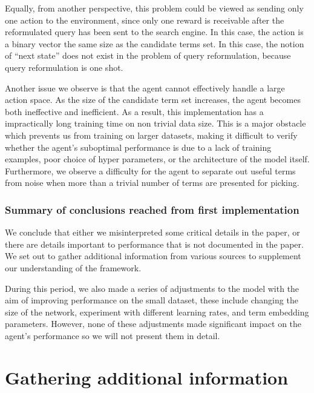 Equally, from another perspective, this problem could be viewed as sending only one action to the environment, since only one reward is receivable after the reformulated query has been sent to the search engine. In this case, the action is a binary vector the same size as the candidate terms set. In this case, the notion of “next state” does not exist in the problem of query reformulation, because query reformulation is one shot.

Another issue we observe is that the agent cannot effectively handle a large action space. As the size of the candidate term set increases, the agent becomes both ineffective and inefficient.  As a result, this implementation has a impractically long training time on non trivial data size. This is a major obstacle which prevents us from training on larger datasets, making it difficult to verify whether the agent’s suboptimal performance is due to a lack of training examples, poor choice of hyper parameters, or the architecture of the model itself. Furthermore, we observe a difficulty for the agent to separate out useful terms from noise when more than a trivial number of terms are presented for picking. 



\subsubsection{Summary of conclusions reached from first implementation}


We conclude that either we misinterpreted some critical details in the paper, or there are details important to performance that is not documented in the paper. We set out to gather additional information from various sources to supplement our understanding of the framework.

During this period, we also made a series of adjustments to the model with the aim of improving performance on the small dataset, these include changing the size of the network, experiment with different learning rates, and term embedding parameters. However, none of these adjustments made significant impact on the agent’s performance so we will not present them in detail.





\section{Gathering additional information}

